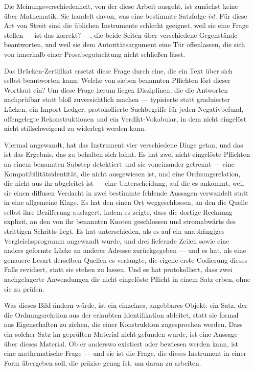 \documentclass[11pt,a4paper]{article}
\theoremstyle{definition}
\begin{document}
Die Meinungsverschiedenheit, von der diese Arbeit ausgeht, ist zunächst keine über
Mathematik. Sie handelt davon, was eine bestimmte Satzfolge \emph{ist}. Für diese
Art von Streit sind die üblichen Instrumente schlecht geeignet, weil sie eine
Frage stellen --- ist das korrekt? ---, die beide Seiten über verschiedene
Gegenstände beantworten, und weil sie dem Autoritätsargument eine Tür offenlassen,
die sich von innerhalb einer Prosabegutachtung nicht schließen lässt.

Das Brücken-Zertifikat ersetzt diese Frage durch eine, die ein Text über sich
selbst beantworten kann: Welche von sieben benannten Pflichten löst dieser
Wortlaut ein? Um diese Frage herum liegen Disziplinen, die die Antworten
nachprüfbar statt bloß zuversichtlich machen --- typisierte statt graduierter
Lücken, ein Import-Ledger, protokollierte Suchbegriffe für jeden Negativbefund,
offengelegte Rekonstruktionen und ein Verdikt-Vokabular, in dem \glqq nicht eingelöst\grqq
nicht stillschweigend zu \glqq widerlegt\grqq{} werden kann.

Viermal angewandt, hat das Instrument vier verschiedene Dinge getan, und das ist
das Ergebnis, das zu behalten sich lohnt. Es hat zwei nicht eingelöste Pflichten
an einem benannten Substep detektiert und sie voneinander getrennt --- eine
Kompatibilitätsidentität, die nicht ausgewiesen ist, und eine Ordnungsrelation,
die nicht aus ihr abgeleitet ist --- eine Unterscheidung, auf die es ankommt, weil
sie einen diffusen Verdacht in zwei bestimmte fehlende Aussagen verwandelt statt
in eine allgemeine Klage. Es hat den
einen Ort weggeschlossen, an den die Quelle selbst ihre Bezifferung auslagert,
indem es zeigte, dass die dortige Rechnung explizit, an den von ihr benannten
Knoten geschlossen und stromabwärts des strittigen Schritts liegt. Es hat
unterschieden, als es auf ein unabhängiges Vergleichsprogramm angewandt wurde, und
drei liefernde Zeilen sowie eine anders
geformte Lücke an anderer Adresse zurückgegeben --- und es hat, als eine genauere
Lesart derselben Quellen es verlangte, die eigene erste Codierung dieses Falls
revidiert, statt sie stehen zu lassen. Und es hat protokolliert, dass
zwei nachgelagerte Anwendungen die nicht eingelöste Pflicht in einem Satz erben,
ohne sie zu prüfen.

Was dieses Bild ändern würde, ist ein einzelnes, angebbares Objekt: ein Satz, der
die Ordnungsrelation aus der erlaubten Identifikation ableitet, statt sie formal
aus Eigenschaften zu ziehen, die einer Konstruktion zugesprochen werden. Dass ein
solcher Satz im geprüften Material nicht gefunden wurde, ist eine Aussage über
dieses Material. Ob er anderswo existiert oder bewiesen werden kann, ist eine
mathematische Frage --- und sie ist die Frage, die dieses Instrument in einer
Form übergeben soll, die präzise genug ist, um daran zu arbeiten.
\end{document}
